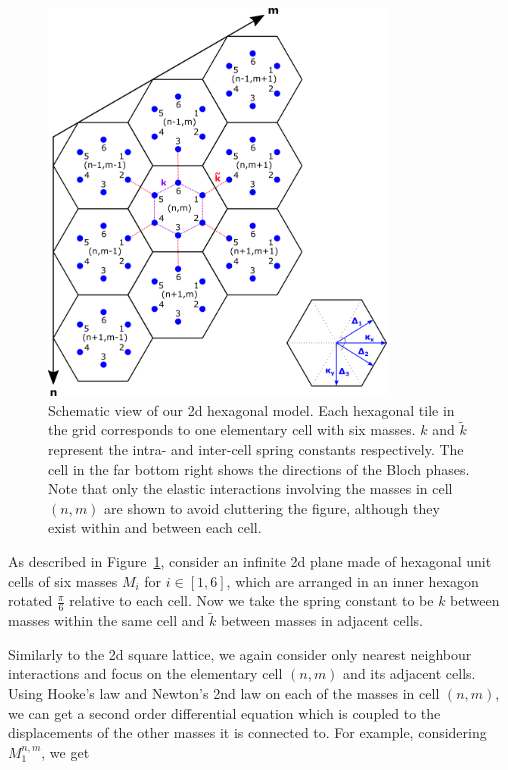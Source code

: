 \begin{figure}[!h]
\centering
\includegraphics[width=0.8\textwidth]{imgs/hexmodel.png}
\caption{\label{fig:hexscheme} Schematic view of our 2d hexagonal model. Each
  hexagonal tile in the grid corresponds to one elementary cell with six
  masses. $k$ and $\tilde{k}$ represent the intra- and inter-cell spring
  constants respectively. The cell in the far bottom right shows the directions
  of the Bloch phases. Note that only the elastic interactions involving the
  masses in cell $(n,m)$ are shown to avoid cluttering the figure, although
  they exist within and between each cell.}
\end{figure}

As described in Figure~\ref{fig:hexscheme}, consider an infinite 2d plane made
of hexagonal unit cells of six masses $M_i$ for $i\in\left[1,6\right]$, which
are arranged in an inner hexagon rotated $\frac{\pi}{6}$ relative to each cell.
Now we take the spring constant to be $k$ between masses within the same cell
and $\tilde{k}$ between masses in adjacent cells.

Similarly to the 2d square lattice, we again consider only nearest neighbour
interactions and focus on the elementary cell $(n,m)$ and its adjacent cells.
Using Hooke's law and Newton's 2nd law on each of the masses in cell $(n,m)$,
we can get a second order differential equation which is coupled to the
displacements of the other masses it is connected to. For example, considering
$M_1^{n,m}$, we get

